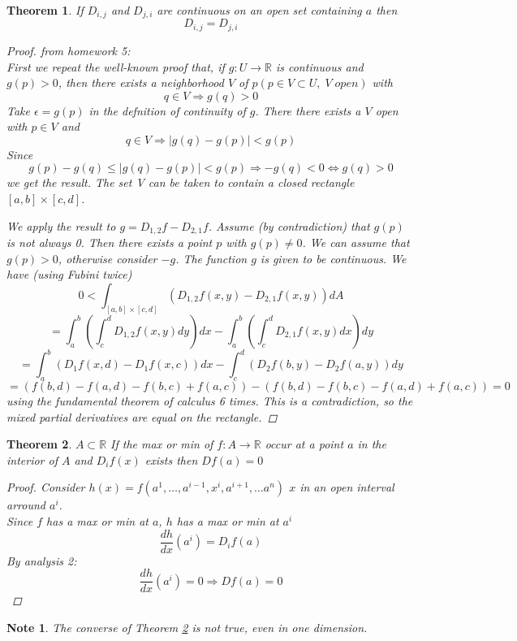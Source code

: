 \documentclass[11pt]{article}
\def\RR{\mathbb{R}}
\newtheorem{theorem}{Theorem}[section]
\newtheorem*{note}{Note}
\begin{document}
\begin{theorem}
If $D_{i,j}$ and $D_{j,i}$ are continuous on an open set containing $a$ then
 \[D_{i,j} = D_{j,i}\]
\begin{proof} from homework 5:\\ 
First we repeat the well-known proof that, if $g : U \rightarrow \RR$ is continuous and $g(p) > 0$,
then there exists a neighborhood $V$ of $ p (p \in V \subset U,\; V \; open)$ with
\[q \in V \Rightarrow g(q) > 0\]
Take $\epsilon = g(p)$ in the defnition of continuity of $g$. There there exists a $V$ open with
$p \in V$ and
\[q \in V \Rightarrow |g(q) - g(p)| < g(p)\]
Since 
\[g(p) - g(q) \leq |g(q) - g(p)| < g(p) \Rightarrow  -g(q) < 0 \Leftrightarrow g(q) > 0\]
we get the result. The set V can be taken to contain a closed rectangle $[a, b] \! \times\! [c, d]$.

We apply the result to $g = D_{1,2}f - D_{2,1}f$. Assume (by contradiction) that $g(p)$ is not
always 0. Then there exists a point $p$ with $g(p) \neq 0$. We can assume that $g(p) > 0$,
otherwise consider $-g$. The function $g$ is given to be continuous. We have (using
Fubini twice)
\[0<\int_{[a, b] \! \times\! [c, d]}(D_{1,2}f(x,y) - D_{2,1}f(x,y))dA\]
\[=\int_{a}^{b}\left(\int_{c}^{d}D_{1,2}f(x,y)dy\right)dx - \int_{a}^{b}\left(\int_{c}^{d}D_{2,1}f(x,y)dx\right)dy\]
\[= \int_{a}^{b}\left(D_{1}f(x,d) - D_{1}f(x,c)\right)dx - \int_{c}^{d}\left(D_{2}f(b,y) - D_{2}f(a,y)\right)dy\]
\[= (f(b, d)-  f(a, d) - f(b, c) + f(a, c)) - (f(b, d)-  f(b, c) - f(a, d) + f(a, c)) = 0\]
using the fundamental theorem of calculus 6 times. This is a contradiction, so the
mixed partial derivatives are equal on the rectangle.
\end{proof}
\end{theorem}

\begin{theorem}\label{maxmin}
$A \subset \RR$ If the max or min of $f:A \rightarrow \RR$ occur at a point $a$ in the interior of $A$ and $D_{i}f(x)$ exists then $Df(a) = 0$
\begin{proof}
Consider $h(x) = f(a^{1}, \dots , a^{i-1} , x^{i}, a^{i+1}, \dots a^{n})$ $x$ in an open interval arround $a^{i}$.\\ Since $f$ has a max or min at $a$, $h$ has a max or min at $a^{i}$
\[\frac{dh}{dx}(a^{i}) = D_{i}f(a)\]
By analysis 2:
\[\frac{dh}{dx}(a^{i}) =0 \Rightarrow Df(a) = 0\]
\end{proof}
\end{theorem}

\begin{note}
The converse of Theorem \ref{maxmin} is not true, even in one dimension.
\end{note}
\end{document}
